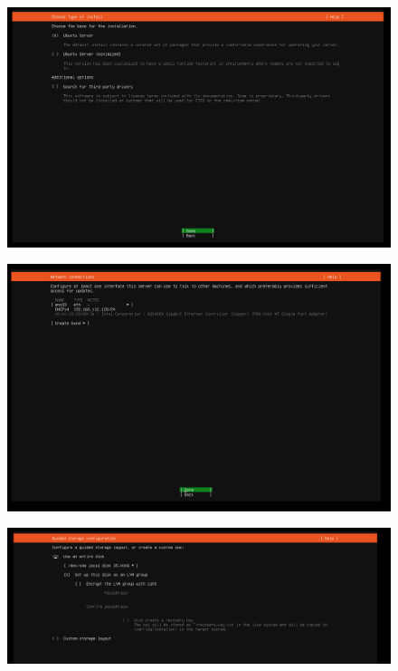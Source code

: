 \documentclass[11pt]{article}
\begin{document}
\begin{figure}[H]
    \centering
    \includegraphics[width=.95\textwidth]{screenshots/10.png}
    \caption{}
\end{figure}
\begin{figure}[H]
    \centering
    \includegraphics[width=.95\textwidth]{screenshots/11.png}
    \caption{}
\end{figure}
\begin{figure}[H]
    \centering
    \includegraphics[width=.95\textwidth]{screenshots/12.png}
    \caption{}
\end{figure}
\end{document}

